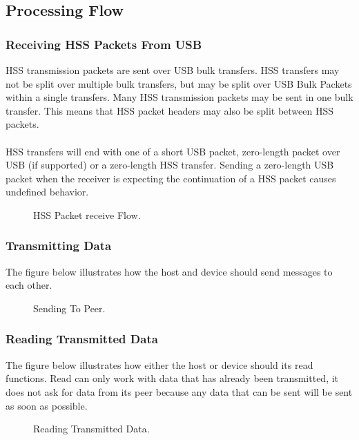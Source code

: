 \documentclass[10pt]{article}
\begin{document}
	\subsection{Processing Flow}
	\subsubsection{Receiving HSS Packets From USB}
	HSS transmission packets are sent over USB bulk transfers. HSS transfers may not be split over multiple bulk transfers, but may be split over USB Bulk Packets within a single transfers. Many HSS transmission packets may be sent in one bulk transfer. This means that HSS packet headers may also be split between HSS packets. \\
	\\
	HSS transfers will end with one of a short USB packet, zero-length packet over USB (if supported) or a zero-length HSS transfer. Sending a zero-length USB packet when the receiver is expecting the continuation of a HSS packet causes undefined behavior. 
	\begin{figure}[H]
	\begin{center}
		\caption[HSS Packet receive Flow.]{HSS Packet receive Flow.}
		 \resizebox{\linewidth}{!}{}
	\end{center}
	\end{figure}

	\subsubsection{Transmitting Data}
	The figure below illustrates how the host and device should send messages to each other. 
	\begin{figure}[H]
	\begin{center}
		\caption[Sending To Peer]{Sending To Peer.}
		\resizebox{\linewidth}{!}{}
	\end{center}
	\end{figure}


	\subsubsection{Reading Transmitted Data}
	The figure below illustrates how either the host or device should its read functions. Read can only work with data that has already been transmitted, it does not ask for data from its peer because any data that can be sent will be sent as soon as possible.
	\begin{figure}[H]
		\begin{center}
			\caption[Reading Transmitted Data.]{Reading Transmitted Data.}
			\resizebox{\linewidth}{!}{}
		\end{center}
	\end{figure}
\end{document}
